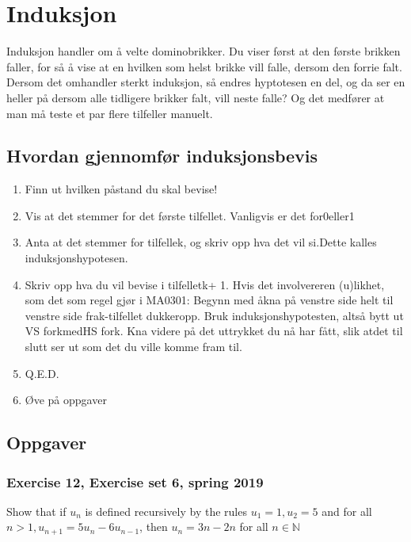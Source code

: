 \section{Induksjon}

Induksjon handler om å velte dominobrikker. Du viser først at den første brikken faller, for så å vise at en hvilken som helst brikke vill falle, dersom den forrie falt.
Dersom det omhandler sterkt induksjon, så endres hyptotesen en del, og da ser en heller på dersom alle tidligere brikker falt, vill neste falle? Og det medfører at man må teste et par flere tilfeller manuelt.

\subsection{Hvordan gjennomfør induksjonsbevis}
\begin{enumerate}
    \item Finn ut hvilken påstand du skal bevise!
    \item Vis at det stemmer for det første tilfellet. Vanligvis er det for0eller1
    \item Anta at det stemmer for tilfellek, og skriv opp hva det vil si.Dette kalles induksjonshypotesen.
    \item Skriv opp hva du vil bevise i tilfelletk+ 1. Hvis det involvereren (u)likhet, som det som regel gjør i MA0301: Begynn med åkna på venstre side helt til venstre side frak-tilfellet dukkeropp. Bruk induksjonshypotesten, altså bytt ut VS forkmedHS fork. Kna videre på det uttrykket du nå har fått, slik atdet til slutt ser ut som det du ville komme fram til.
    \item Q.E.D.
    \item Øve på oppgaver
\end{enumerate}

\subsection{Oppgaver}

\subsubsection{Exercise 12, Exercise set 6, spring 2019}
Show that if $u_n$ is defined recursively by the 
rules $u_1 = 1,u_2 = 5$ and for all $n>1,u_{n+1}= 5u_n -6u_{n-1}$, then $u_n = 3n-2n$ for all $n\in \mathbb{N}$
